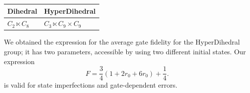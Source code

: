 \documentclass[12pt]{article}
\begin{document}
\begin{tcbposter}
{\begin{minipage}{0.45\linewidth}
\begin{center}
\begin{tabular}{l|l}
Dihedral          & HyperDihedral                 \\
\hline
$C_2 \ltimes C_8$ & $ C_3 \ltimes C_9 \times C_9$
\end{tabular}
\end{center}

\par
We obtained the expression for the average gate fidelity 
for the HyperDihedral group;
it has two parameters, accessible by using two different initial states.
Our expression 
\begin{equation*}
    \textstyle F = \frac{3}{4}(1+2r_0 + 6 r_0) + \frac{1}{4}.
\end{equation*}
is valid for state imperfections and gate-dependent errors.
\end{minipage}



}
\end{tcbposter}
\end{document}
